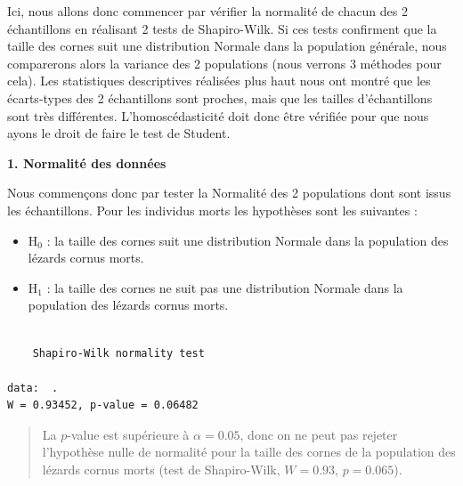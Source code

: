 \documentclass[a4paperpaper,]{article}
\newenvironment{Shaded}{\begin{snugshade}}{\end{snugshade}}
\newcommand{\KeywordTok}[1]{\textcolor[rgb]{0.12,0.11,0.11}{\textbf{#1}}}
\newcommand{\NormalTok}[1]{\textcolor[rgb]{0.12,0.11,0.11}{#1}}
\newcommand{\OperatorTok}[1]{\textcolor[rgb]{0.12,0.11,0.11}{#1}}
\newcommand{\StringTok}[1]{\textcolor[rgb]{0.75,0.01,0.01}{#1}}
\providecommand{\tightlist}{%
  \setlength{\itemsep}{0pt}\setlength{\parskip}{0pt}}
\begin{document}
Ici, nous allons donc commencer par vérifier la normalité de chacun des 2 échantillons en réalisant 2 tests de Shapiro-Wilk. Si ces tests confirment que la taille des cornes suit une distribution Normale dans la population générale, nous comparerons alors la variance des 2 populations (nous verrons 3 méthodes pour cela). Les statistiques descriptives réalisées plus haut nous ont montré que les écarts-types des 2 échantillons sont proches, mais que les tailles d'échantillons sont très différentes. L'homoscédasticité doit donc être vérifiée pour que nous ayons le droit de faire le test de Student.

\textbf{1. Normalité des données}

Nous commençons donc par tester la Normalité des 2 populations dont sont issus les échantillons. Pour les individus morts les hypothèses sont les suivantes :

\begin{itemize}
\tightlist
\item
  H\(_0\) : la taille des cornes suit une distribution Normale dans la population des lézards cornus morts.
\item
  H\(_1\) : la taille des cornes ne suit pas une distribution Normale dans la population des lézards cornus morts.
\end{itemize}

\begin{Shaded}
\end{Shaded}

\begin{verbatim}

    Shapiro-Wilk normality test

data:  .
W = 0.93452, p-value = 0.06482
\end{verbatim}

\begin{quote}
La \(p\)-value est supérieure à \(\alpha = 0.05\), donc on ne peut pas rejeter l'hypothèse nulle de normalité pour la taille des cornes de la population des lézards cornus morts (test de Shapiro-Wilk, \(W = 0.93\), \(p = 0.065\)).
\end{quote}
\end{document}

